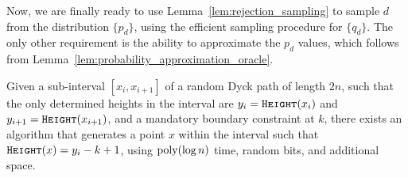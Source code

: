 Now, we are finally ready to use Lemma~\ref{lem:rejection_sampling} to sample $d$ from the distribution $\{p_d\}$,
using the efficient sampling procedure for $\{q_d\}$.
The only other requirement is the ability to approximate the $p_d$ values, which follows from Lemma~\ref{lem:probability_approximation_oracle}.
\begin{theorem}
\label{thm:first_return_in_interval}
Given a sub-interval $[x_{i},x_{i+1}]$ of a random Dyck path of length $2n$,
such that the only determined heights in the interval are $y_i=\texttt{\textsc{Height}}(x_i)$ and $y_{i+1}=\texttt{\textsc{Height}}(x_{i+1})$,
and a mandatory boundary constraint at $k$,
there exists an algorithm that generates a point $x$ within the interval such that $\texttt{\textsc{Height}}(x) = y_i-k+1$,
using $\mathrm{poly}(\log n)$ time, random bits, and additional space.
\end{theorem}



